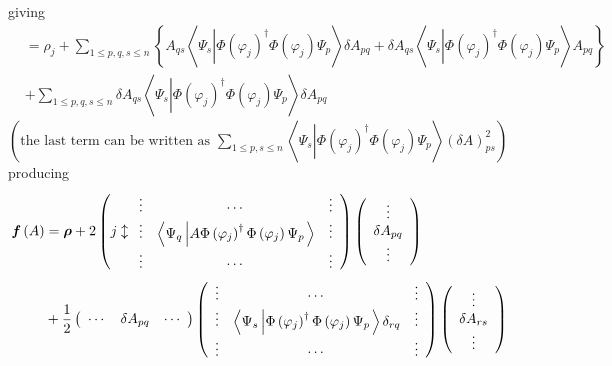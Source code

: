 \documentclass[aps,preprint]{revtex4}%
\begin{document}
giving%
\begin{align}
&  =\rho_{j}+\sum_{1\leq p,q,s\leq n}\left\{  A_{qs}\left\langle \Psi
_{s}\left\vert \Phi\left(  \varphi_{j}\right)  ^{\dagger}\Phi\left(
\varphi_{j}\right)  \Psi_{p}\right.  \right\rangle \delta A_{pq}+\delta
A_{qs}\left\langle \Psi_{s}\left\vert \Phi\left(  \varphi_{j}\right)
^{\dagger}\Phi\left(  \varphi_{j}\right)  \Psi_{p}\right.  \right\rangle
A_{pq}\right\} \\
&  +\sum_{1\leq p,q,s\leq n}\delta A_{qs}\left\langle \Psi_{s}\left\vert
\Phi\left(  \varphi_{j}\right)  ^{\dagger}\Phi\left(  \varphi_{j}\right)
\Psi_{p}\right.  \right\rangle \delta A_{pq}%
\end{align}
$\left(  \text{the last term can be written as }\sum_{1\leq p,s\leq
n}\left\langle \Psi_{s}\left\vert \Phi\left(  \varphi_{j}\right)  ^{\dagger
}\Phi\left(  \varphi_{j}\right)  \Psi_{p}\right.  \right\rangle \left(  \delta
A\right)  _{ps}^{2}\right)  $ producing
\begin{align}
\boldsymbol{f}\left(  A\right)   &  =\boldsymbol{\rho}+2\left(  j\updownarrow%
\begin{array}
[c]{ccc}%
\vdots & \cdots & \vdots\\
\vdots & \left\langle \Psi_{q}\left\vert A\Phi\left(  \varphi_{j}\right)
^{\dagger}\Phi\left(  \varphi_{j}\right)  \Psi_{p}\right.  \right\rangle  &
\vdots\\
\vdots & \cdots & \vdots
\end{array}
\right)  \left(
\begin{array}
[c]{c}%
\vdots\\
\delta A_{pq}\\
\vdots
\end{array}
\right) \\
&  +\frac{1}{2}\left(
\begin{array}
[c]{ccc}%
\cdots & \delta A_{pq} & \cdots
\end{array}
\right)  \left(
\begin{array}
[c]{ccc}%
\vdots & \cdots & \vdots\\
\vdots & \left\langle \Psi_{s}\left\vert \Phi\left(  \varphi_{j}\right)
^{\dagger}\Phi\left(  \varphi_{j}\right)  \Psi_{p}\right.  \right\rangle
\delta_{rq} & \vdots\\
\vdots & \cdots & \vdots
\end{array}
\right)  \left(
\begin{array}
[c]{c}%
\vdots\\
\delta A_{rs}\\
\vdots
\end{array}
\right)
\end{align}
\end{document}
